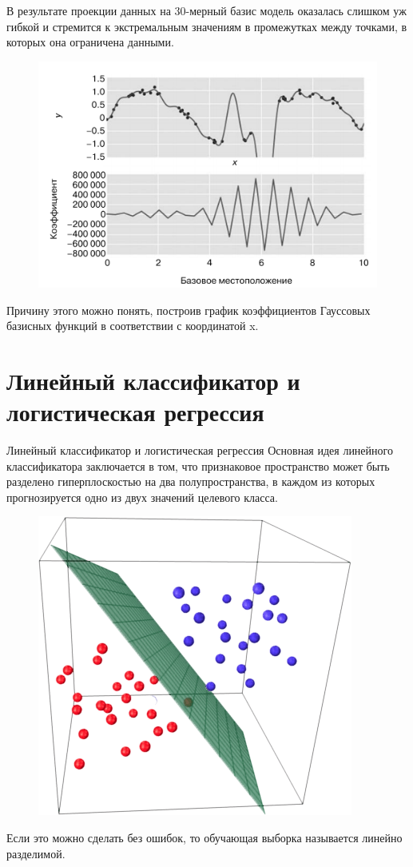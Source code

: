 \documentclass{beamer}
\begin{document}
\begin{frame}[fragile]
В результате проекции данных на 30-мерный базис модель оказалась слишком уж
гибкой и стремится к экстремальным значениям в промежутках между точками, в которых она ограничена данными.
\begin{figure}[h]
\centering
\includegraphics[scale=0.6]{images/complex-03.png}
\end{figure}
Причину этого можно понять, построив график коэффициентов Гауссовых базисных функций в соответствии с координатой x.
\end{frame}

\section{Линейный классификатор и логистическая регрессия}

\begin{frame}[fragile]{Линейный классификатор и логистическая регрессия}
Основная идея линейного классификатора заключается в том, что признаковое пространство может быть разделено гиперплоскостью на два полупространства, в каждом из которых прогнозируется одно из двух значений целевого класса.
\begin{figure}[h]
\centering
\includegraphics[scale=0.4]{images/logistic-01.png}
\end{figure}
Если это можно сделать без ошибок, то обучающая выборка называется линейно разделимой.
\end{frame}
\end{document}
